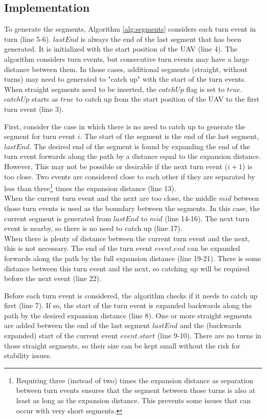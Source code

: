\subsection{Implementation}
To generate the segments, Algorithm \ref{alg:segments} considers each turn event in turn (line 5-6). $lastEnd$ is always the end of the last segment that has been generated. It is initialized with the start position of the UAV (line 4). The algorithm considers turn events, but consecutive turn events may have a large distance between them. In those cases, additional segments (straight, without turns) may need to generated to "catch up" with the start of the turn events. When straight segments need to be inserted, the $catchUp$ flag is set to $true$. $catchUp$ starts as $true$ to catch up from the start position of the UAV to the first turn event (line 3).
\par
First, consider the case in which there is no need to catch up to generate the segment for turn event $i$. The start of the segment is the end of the last segment, $lastEnd$. The desired end of the segment is found by expanding the end of the turn event forwards along the path by a distance equal to the expansion distance. However, This may not be possible or desirable if the next turn event ($i+1$) is too close. Two events are considered close to each other if they are separated by less than three\footnote{Requiring three (instead of two) times the expansion distance as separation between turn events ensures that the segment between those turns is also at least as long as the expansion distance. This prevents some issues that can occur with very short segments.} times the expansion distance (line 13). \\
When the current turn event and the next are too close, the middle $mid$ between those turn events is used as the boundary between the segments. In this case, the current segment is generated from $lastEnd$ to $mid$ (line 14-16). The next turn event is nearby, so there is no need to catch up (line 17). \\
When there is plenty of distance between the current turn event and the next, this is not necessary. The end of the turn event $event.end$ can be expanded forwards along the path by the full expansion distance (line 19-21). There is some distance between this turn event and the next, so catching up will be required before the next event (line 22). \\
\par
Before each turn event is considered, the algorithm checks if it needs to catch up first (line 7). If so, the start of the turn event is expanded backwards along the path by the desired expansion distance (line 8). One or more straight segments are added between the end of the last segment $lastEnd$ and the (backwards expanded) start of the current event $event.start$ (line 9-10). There are no turns in those straight segments, so their size can be kept small without the risk for stability issues.
